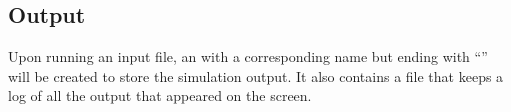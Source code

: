 % 


\subsection{Output}


Upon running an input file, an  with a corresponding name but ending with ``'' will be created to store the simulation output. It also contains a file  that keeps a log of all the output that appeared on the screen.  


